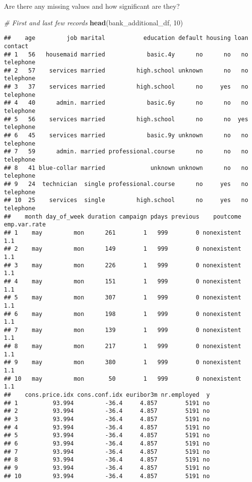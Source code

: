 \documentclass[
]{article}
\newenvironment{Shaded}{\begin{snugshade}}{\end{snugshade}}
\newcommand{\CommentTok}[1]{\textcolor[rgb]{0.56,0.35,0.01}{\textit{#1}}}
\newcommand{\DecValTok}[1]{\textcolor[rgb]{0.00,0.00,0.81}{#1}}
\newcommand{\FunctionTok}[1]{\textcolor[rgb]{0.13,0.29,0.53}{\textbf{#1}}}
\newcommand{\NormalTok}[1]{#1}
\begin{document}
Are there any missing values and how significant are they?

\begin{Shaded}
\begin{Highlighting}[]
\CommentTok{\# First and last few records}
\FunctionTok{head}\NormalTok{(bank\_additional\_df, }\DecValTok{10}\NormalTok{)}
\end{Highlighting}
\end{Shaded}

\begin{verbatim}
##    age         job marital           education default housing loan   contact
## 1   56   housemaid married            basic.4y      no      no   no telephone
## 2   57    services married         high.school unknown      no   no telephone
## 3   37    services married         high.school      no     yes   no telephone
## 4   40      admin. married            basic.6y      no      no   no telephone
## 5   56    services married         high.school      no      no  yes telephone
## 6   45    services married            basic.9y unknown      no   no telephone
## 7   59      admin. married professional.course      no      no   no telephone
## 8   41 blue-collar married             unknown unknown      no   no telephone
## 9   24  technician  single professional.course      no     yes   no telephone
## 10  25    services  single         high.school      no     yes   no telephone
##    month day_of_week duration campaign pdays previous    poutcome emp.var.rate
## 1    may         mon      261        1   999        0 nonexistent          1.1
## 2    may         mon      149        1   999        0 nonexistent          1.1
## 3    may         mon      226        1   999        0 nonexistent          1.1
## 4    may         mon      151        1   999        0 nonexistent          1.1
## 5    may         mon      307        1   999        0 nonexistent          1.1
## 6    may         mon      198        1   999        0 nonexistent          1.1
## 7    may         mon      139        1   999        0 nonexistent          1.1
## 8    may         mon      217        1   999        0 nonexistent          1.1
## 9    may         mon      380        1   999        0 nonexistent          1.1
## 10   may         mon       50        1   999        0 nonexistent          1.1
##    cons.price.idx cons.conf.idx euribor3m nr.employed  y
## 1          93.994         -36.4     4.857        5191 no
## 2          93.994         -36.4     4.857        5191 no
## 3          93.994         -36.4     4.857        5191 no
## 4          93.994         -36.4     4.857        5191 no
## 5          93.994         -36.4     4.857        5191 no
## 6          93.994         -36.4     4.857        5191 no
## 7          93.994         -36.4     4.857        5191 no
## 8          93.994         -36.4     4.857        5191 no
## 9          93.994         -36.4     4.857        5191 no
## 10         93.994         -36.4     4.857        5191 no
\end{verbatim}
\end{document}
